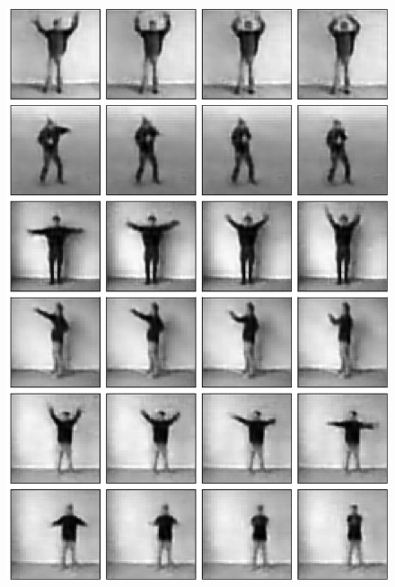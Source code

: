 \begin{frame}
\begin{figure}[h!]
\begin{minipage}[position=r]{0.4\textwidth}
			\includegraphics[scale=0.299]{Bilder/movies_extrapolation}
	\end{minipage}
\end{figure}
\end{frame}

